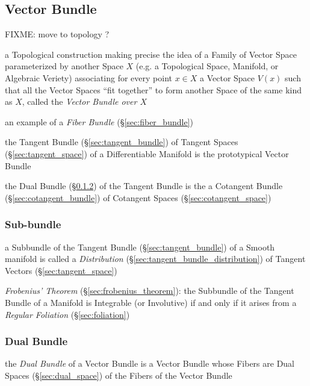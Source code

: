 \subsection{Vector Bundle}\label{sec:vector_bundle}

FIXME: move to topology ?

a Topological construction making precise the idea of a Family of Vector Space
parameterized by another Space $X$ (e.g. a Topological Space, Manifold, or
Algebraic Veriety) associating for every point $x \in X$ a Vector Space $V(x)$
such that all the Vector Spaces ``fit together'' to form another Space of the
same kind as $X$, called the \emph{Vector Bundle over $X$}

an example of a \emph{Fiber Bundle} (\S\ref{sec:fiber_bundle})

the Tangent Bundle (\S\ref{sec:tangent_bundle}) of Tangent Spaces
(\S\ref{sec:tangent_space}) of a Differentiable Manifold is the prototypical
Vector Bundle

the Dual Bundle (\S\ref{sec:dual_bundle}) of the Tangent Bundle is the
a Cotangent Bundle (\S\ref{sec:cotangent_bundle}) of
Cotangent Spaces (\S\ref{sec:cotangent_space})



\subsubsection{Sub-bundle}\label{sec:subbundle}

\fist a Subbundle of the Tangent Bundle (\S\ref{sec:tangent_bundle}) of a
Smooth manifold is called a \emph{Distribution}
(\S\ref{sec:tangent_bundle_distribution}) of Tangent Vectors
(\S\ref{sec:tangent_space})

\emph{Frobenius' Theorem} (\S\ref{sec:frobenius_theorem}): the Subbundle of the
Tangent Bundle of a Manifold is Integrable (or Involutive) if and only if it
arises from a \emph{Regular Foliation} (\S\ref{sec:foliation})



\subsubsection{Dual Bundle}\label{sec:dual_bundle}

the \emph{Dual Bundle} of a Vector Bundle is a Vector Bundle whose Fibers are
Dual Spaces (\S\ref{sec:dual_space}) of the Fibers of the Vector Bundle

